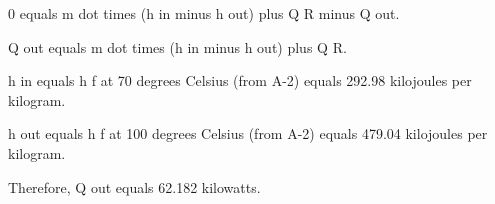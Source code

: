 0 equals m dot times (h in minus h out) plus Q R minus Q out.  

Q out equals m dot times (h in minus h out) plus Q R.  

h in equals h f at 70 degrees Celsius (from A-2) equals 292.98 kilojoules per kilogram.  

h out equals h f at 100 degrees Celsius (from A-2) equals 479.04 kilojoules per kilogram.  

Therefore, Q out equals 62.182 kilowatts.